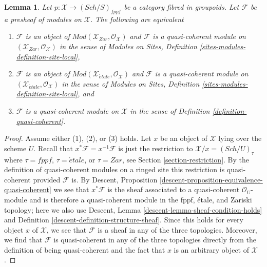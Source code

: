\documentclass{stacks-project}
\theoremstyle{plain}
\newtheorem{lemma}[subsection]{Lemma}
\theoremstyle{definition}
\theoremstyle{remark}
\numberwithin{equation}{subsection}
\def\Sch{\mathit{Sch}}
\def\etale{{\acute{e}tale}}
\begin{document}
\begin{lemma}
\label{lemma-characterize-quasi-coherent-bis}
Let $p : \mathcal{X} \to (\Sch/S)_{fppf}$ be a category
fibred in groupoids. Let $\mathcal{F}$ be a presheaf of
modules on $\mathcal{X}$. The following are equivalent
\begin{enumerate}
\item $\mathcal{F}$ is an object of
$\textit{Mod}(\mathcal{X}_{Zar}, \mathcal{O}_\mathcal{X})$
and $\mathcal{F}$ is a quasi-coherent module on
$(\mathcal{X}_{Zar}, \mathcal{O}_\mathcal{X})$ in the sense of
Modules on Sites, Definition \ref{sites-modules-definition-site-local},
\item $\mathcal{F}$ is an object of
$\textit{Mod}(\mathcal{X}_\etale, \mathcal{O}_\mathcal{X})$
and $\mathcal{F}$ is a quasi-coherent module on
$(\mathcal{X}_\etale, \mathcal{O}_\mathcal{X})$ in the sense of
Modules on Sites, Definition \ref{sites-modules-definition-site-local}, and
\item $\mathcal{F}$ is a quasi-coherent module on $\mathcal{X}$
in the sense of Definition \ref{definition-quasi-coherent}.
\end{enumerate}
\end{lemma}

\begin{proof}
Assume either (1), (2), or (3) holds.
Let $x$ be an object of $\mathcal{X}$ lying over the scheme $U$.
Recall that $x^*\mathcal{F} = x^{-1}\mathcal{F}$ is just the
restriction to $\mathcal{X}/x = (\Sch/U)_\tau$ where
$\tau = fppf$, $\tau = \etale$, or $\tau = Zar$, see
Section \ref{section-restriction}.
By the definition of quasi-coherent modules on a ringed site
this restriction is quasi-coherent provided $\mathcal{F}$ is.
By Descent, Proposition \ref{descent-proposition-equivalence-quasi-coherent}
we see that $x^*\mathcal{F}$ is the sheaf associated to
a quasi-coherent $\mathcal{O}_U$-module and is therefore
a quasi-coherent module in the fppf, \'etale, and Zariski
topology; here we also use
Descent, Lemma \ref{descent-lemma-sheaf-condition-holds} and
Definition \ref{descent-definition-structure-sheaf}.
Since this holds for every object $x$ of $\mathcal{X}$,
we see that $\mathcal{F}$ is a sheaf in any of the three topologies.
Moreover, we find that $\mathcal{F}$ is quasi-coherent in any
of the three topologies directly from the definition of being
quasi-coherent and the fact that $x$ is an arbitrary object of $\mathcal{X}$.
\end{proof}
\end{document}
